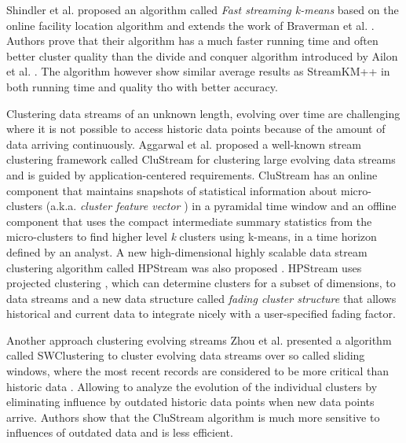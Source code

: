Shindler et al. \citep{Shindler:2011} proposed an algorithm called \textit{Fast streaming k-means} based on the online facility location algorithm \citep{Meyerson:2001} and extends the work of Braverman et al. \citep{Braverman:2011}. Authors prove that their algorithm has a much faster running time and often better cluster quality than the divide and conquer algorithm introduced by Ailon et al. \citep{Ailon:2009}. The algorithm however show similar average results as StreamKM++ \citep{Ackermann:2010} in both running time and quality tho with better accuracy.

Clustering data streams of an unknown length, evolving over time \citep{Aggarwal:2002, Aggarwal:2003Evolving} are challenging where it is not possible to access historic data points because of the amount of data arriving continuously. Aggarwal et al. \citep{Aggarwal:2003} proposed a well-known stream clustering framework called CluStream for clustering large evolving data streams and is guided by application-centered requirements. CluStream has an online component that maintains snapshots of statistical information about micro-clusters (a.k.a. \textit{cluster feature vector} \citep{Zhang:1996}) in a pyramidal time window and an offline component that uses the compact intermediate summary statistics from the micro-clusters to find higher level \textit{k} clusters using k-means, in a time horizon defined by an analyst. A new high-dimensional highly scalable data stream clustering algorithm called HPStream was also proposed \citep{Aggarwal:2004}. HPStream uses projected clustering \citep{Aggarwal:1999}, which can determine clusters for a subset of dimensions, to data streams and a new data structure called \textit{fading cluster structure} that allows historical and current data to integrate nicely with a user-specified fading factor. 

Another approach clustering evolving streams Zhou et al. \citep{Zhou:2008} presented a algorithm called SWClustering to cluster evolving data streams over so called sliding windows, where the most recent records are considered to be more critical than historic data \citep{Datar:2002SW}. Allowing to analyze the evolution of the individual clusters by eliminating influence by outdated historic data points when new data points arrive. Authors show that the CluStream algorithm \citep{Aggarwal:2003} is much more sensitive to influences of outdated data and is less efficient.

